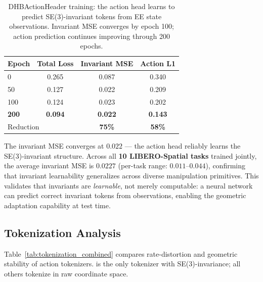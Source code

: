 \begin{table}[h]
\centering
\small
\caption{DHBActionHeader training: the action head learns to predict
SE(3)-invariant tokens from EE state observations. Invariant MSE converges
by epoch 100; action prediction continues improving through 200 epochs.}
\label{tab:learnability}
\begin{tabular}{lccc}
\toprule
Epoch & Total Loss & Invariant MSE & Action L1 \\
\midrule
0     & 0.265 & 0.087 & 0.340 \\
50    & 0.127 & 0.022 & 0.209 \\
100   & 0.124 & 0.023 & 0.202 \\
\textbf{200}   & \textbf{0.094} & \textbf{0.022} & \textbf{0.143} \\
\midrule
\multicolumn{2}{l}{Reduction} & \textbf{75\%} & \textbf{58\%} \\
\bottomrule
\end{tabular}
\end{table}

The invariant MSE converges at $0.022$ --- the action head reliably learns the
SE(3)-invariant structure. Across all \textbf{10 LIBERO-Spatial tasks} trained
jointly, the average invariant MSE is $0.0227$ (per-task range: $0.011$--$0.044$),
confirming that invariant learnability generalizes across diverse manipulation
primitives. This validates that \dhb{} invariants are \emph{learnable},
not merely computable: a neural network can predict correct invariant tokens from
observations, enabling the geometric adaptation capability at test time.

\subsection{Tokenization Analysis}

Table~\ref{tab:tokenization_combined} compares rate-distortion and geometric stability
of action tokenizers. \dhb{} is the only tokenizer with SE(3)-invariance;
all others tokenize in raw coordinate space.

